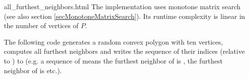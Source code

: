 \begin{ccHtmlClassFile}{all_furthest_neighbors.html}
  \ccImplementation The implementation uses monotone matrix
  search\cite{akmsw-gamsa-87} (see also section
  \ref{secMonotoneMatrixSearch}). Its runtime complexity is linear in
  the number of vertices of $P$.

  \ccExample The following code generates a random convex polygon
   with ten vertices, computes all furthest neighbors and writes
  the sequence of their indices (relative to ) to
   (e.g. a sequence of  means the furthest
  neighbor of  is , the
  furthest neighbor of  is 
  etc.).


\end{ccHtmlClassFile}

